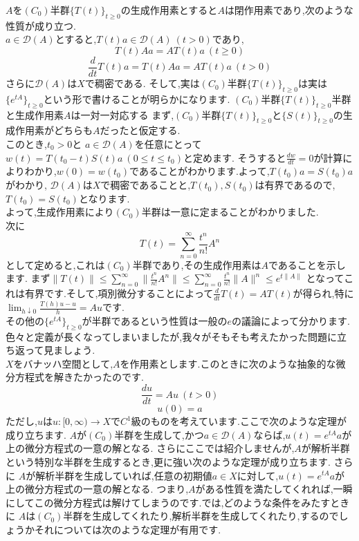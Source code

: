 \thm
$A$を$(C_0)$半群$\{T(t)\}_{t\ge 0}$の生成作用素とすると$A$は閉作用素であり,次のような性質が成り立つ.\\
$a \in \mathcal{D}(A)$とすると,$T(t)a \in \mathcal{D}(A) \ (t>0)$であり,
\[
T(t) A a= AT(t) a \ (t\ge 0)
\]
\[
\frac{d}{dt}T(t) a = T(t) A a = A T(t) a \ (t>0)
\]
さらに$\mathcal{D}(A)$は$X$で稠密である.
\thmx
そして,実は$(C_0)$半群$\{T(t)\}_{t\ge 0}$は実は$\{e^{tA}\}_{t\ge 0}$という形で書けることが明らかになります.
\thm
$(C_0)$半群$\{T(t)\}_{t\ge 0}$半群と生成作用素$A$は一対一対応する
\thmx
\proof
まず,$(C_0)$半群$\{T(t)\}_{t\ge 0}$と$\{S(t)\}_{t\ge 0}$の生成作用素がどちらも$A$だったと仮定する.\\
このとき,$t_0 >0 $と $a\in \mathcal{D}(A)$を任意にとって$w(t) = T(t_0 - t) S(t) a\ (0 \le t \le t_0)$と定めます.
そうすると$\frac{dw}{dt} = 0$が計算によりわかり,$w(0)=w(t_0)$であることがわかります.よって,$T(t_0)a=S(t_0)a$がわかり,
$\mathcal{D}(A)$は$X$で稠密であることと,$T(t_0),S(t_0)$は有界であるので,$T(t_0)=S(t_0)$となります.\\
よって,生成作用素により$(C_0)$半群は一意に定まることがわかりました.\\
次に\[
T(t) = \sum_{n=0}^\infty \frac{t^n}{n!}A^n
\]
として定めると,これは$(C_0)$半群であり,その生成作用素は$A$であることを示します.
まず$\|T(t)\| \le  \sum_{n=0}^\infty \| \frac{t^n}{n!}A^n \| \le \sum_{n=0}^\infty  \frac{t^n}{n!}\|A\|^n \le e^{t\|A\|}$
となってこれは有界です.そして,項別微分することによって$\frac{d}{dt}T(t) = AT(t)$が得られ,特に$\lim_{h\downarrow 0} \frac{T(h)u-u}{h} = Au$です.\\
その他の$\{e^{tA}\}_{t\ge 0}$が半群であるという性質は一般の$e$の議論によって分かります.
\proofx
{}
色々と定義が長くなってしまいましたが,我々がそもそも考えたかった問題に立ち返って見ましょう.\\
$X$をバナッハ空間として,$A$を作用素とします.このときに次のような抽象的な微分方程式を解きたかったのです.\\
\[ \frac{du}{dt} = Au \ (t>0) \]
\[ u(0) = a \]
ただし,$u$は$u:[0,\infty) \to  X$で$C^1$級のものを考えています.ここで次のような定理が成り立ちます.
\thm
$A$が$(C_0)$半群を生成して,かつ$a \in \mathcal{D}(A)$ならば,$u(t) = e^{tA} a$が上の微分方程式の一意の解となる.
\thmx
さらにここでは紹介しませんが,$A$が解析半群という特別な半群を生成するとき,更に強い次のような定理が成り立ちます.
\thm
さらに $A$が解析半群を生成していれば,任意の初期値$a\in X$に対して,$u(t) = e^{tA} a$が上の微分方程式の一意の解となる.
\thmx
つまり,$A$がある性質を満たしてくれれば,一瞬にしてこの微分方程式は解けてしまうのです.では,どのような条件をみたすときに
$A$は$(C_0)$半群を生成してくれたり,解析半群を生成してくれたり,するのでしょうかそれについては次のような定理が有用です.

